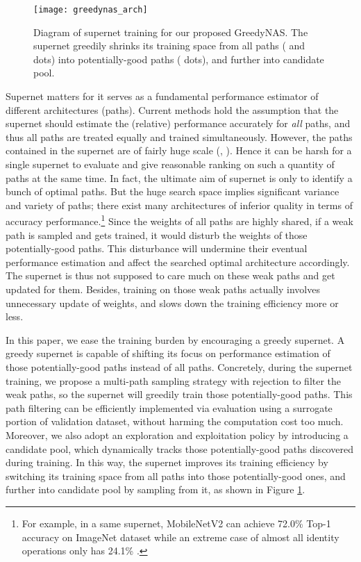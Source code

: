 \documentclass[10pt,twocolumn,letterpaper]{article}
\begin{document}
\begin{figure}
	\centering
	\texttt{[image: greedynas\_arch]}
	\vspace{-5mm}
	\caption{Diagram of supernet training for our proposed GreedyNAS. The supernet greedily shrinks its training space from all paths ( and  dots) into potentially-good paths ( dots), and further into candidate pool.}
	\vspace{-4mm}
	\label{fig:shiyi}
\end{figure}





Supernet matters for it serves as a fundamental performance estimator of different architectures (paths). Current methods \cite{random,face++,fairnas,scarletnas} hold the assumption that the supernet should estimate the (relative) performance accurately for \textit{all} paths, and thus all paths are treated equally and trained simultaneously. However, the paths contained in the supernet are of fairly huge scale (\eg, ).  Hence it can be harsh for a single supernet to evaluate and give reasonable ranking on such a quantity of paths at the same time. In fact, the ultimate aim of supernet is only to identify a bunch of optimal paths. But the huge search space implies significant variance and variety of paths; there exist many architectures of inferior quality in terms of accuracy performance.\footnote{For example, in a same supernet, MobileNetV2 \cite{mobilenetv2} can achieve 72.0\% Top-1 accuracy on ImageNet dataset while an extreme case of almost all identity operations only has 24.1\% \cite{scarletnas}.} Since the weights of all paths are highly shared, if a weak path is sampled and gets trained, it would disturb the weights of those potentially-good paths. This disturbance will undermine their eventual performance estimation and affect the searched optimal architecture accordingly. The supernet is thus not supposed to care much on these weak paths and get updated for them. Besides, training on those weak paths actually involves unnecessary update of weights, and slows down the training efficiency more or less. 

In this paper, we ease the training burden by encouraging a greedy supernet. A greedy supernet is capable of shifting its focus on performance estimation of those potentially-good paths instead of all paths. 
Concretely, during the supernet training, we propose a multi-path sampling strategy with rejection to filter the weak paths, so the supernet will greedily train those potentially-good paths. This path filtering can be efficiently implemented via evaluation using a surrogate portion of validation dataset, without harming the computation cost too much. Moreover, we also adopt an exploration and exploitation policy \cite{kocsis2006bandit,mnih2013playing} by introducing a candidate pool, which dynamically tracks those potentially-good paths discovered during training. In this way, the supernet improves its training efficiency by switching its training space from all paths into those potentially-good ones, and further into candidate pool by sampling from it, as shown in Figure \ref{fig:shiyi}.  
\end{document}
